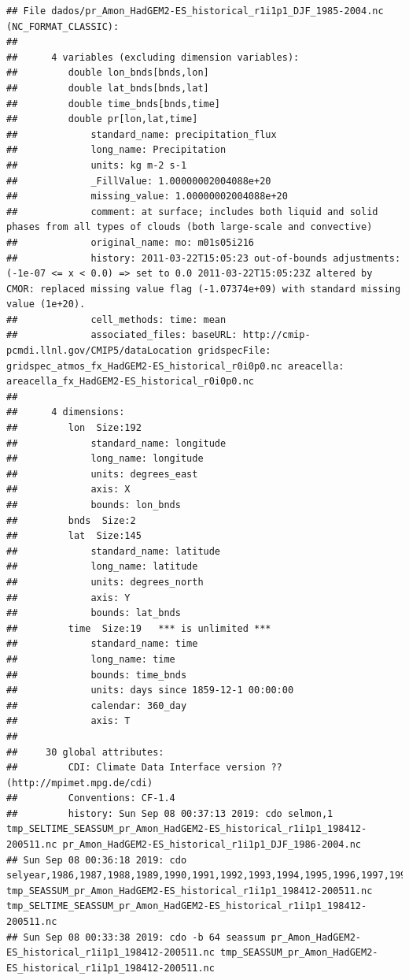 \documentclass[]{book}
\begin{document}
\begin{verbatim}
## File dados/pr_Amon_HadGEM2-ES_historical_r1i1p1_DJF_1985-2004.nc (NC_FORMAT_CLASSIC):
## 
##      4 variables (excluding dimension variables):
##         double lon_bnds[bnds,lon]   
##         double lat_bnds[bnds,lat]   
##         double time_bnds[bnds,time]   
##         double pr[lon,lat,time]   
##             standard_name: precipitation_flux
##             long_name: Precipitation
##             units: kg m-2 s-1
##             _FillValue: 1.00000002004088e+20
##             missing_value: 1.00000002004088e+20
##             comment: at surface; includes both liquid and solid phases from all types of clouds (both large-scale and convective)
##             original_name: mo: m01s05i216
##             history: 2011-03-22T15:05:23 out-of-bounds adjustments: (-1e-07 <= x < 0.0) => set to 0.0 2011-03-22T15:05:23Z altered by CMOR: replaced missing value flag (-1.07374e+09) with standard missing value (1e+20).
##             cell_methods: time: mean
##             associated_files: baseURL: http://cmip-pcmdi.llnl.gov/CMIP5/dataLocation gridspecFile: gridspec_atmos_fx_HadGEM2-ES_historical_r0i0p0.nc areacella: areacella_fx_HadGEM2-ES_historical_r0i0p0.nc
## 
##      4 dimensions:
##         lon  Size:192
##             standard_name: longitude
##             long_name: longitude
##             units: degrees_east
##             axis: X
##             bounds: lon_bnds
##         bnds  Size:2
##         lat  Size:145
##             standard_name: latitude
##             long_name: latitude
##             units: degrees_north
##             axis: Y
##             bounds: lat_bnds
##         time  Size:19   *** is unlimited ***
##             standard_name: time
##             long_name: time
##             bounds: time_bnds
##             units: days since 1859-12-1 00:00:00
##             calendar: 360_day
##             axis: T
## 
##     30 global attributes:
##         CDI: Climate Data Interface version ?? (http://mpimet.mpg.de/cdi)
##         Conventions: CF-1.4
##         history: Sun Sep 08 00:37:13 2019: cdo selmon,1 tmp_SELTIME_SEASSUM_pr_Amon_HadGEM2-ES_historical_r1i1p1_198412-200511.nc pr_Amon_HadGEM2-ES_historical_r1i1p1_DJF_1986-2004.nc
## Sun Sep 08 00:36:18 2019: cdo selyear,1986,1987,1988,1989,1990,1991,1992,1993,1994,1995,1996,1997,1998,1999,2000,2001,2002,2003,2004 tmp_SEASSUM_pr_Amon_HadGEM2-ES_historical_r1i1p1_198412-200511.nc tmp_SELTIME_SEASSUM_pr_Amon_HadGEM2-ES_historical_r1i1p1_198412-200511.nc
## Sun Sep 08 00:33:38 2019: cdo -b 64 seassum pr_Amon_HadGEM2-ES_historical_r1i1p1_198412-200511.nc tmp_SEASSUM_pr_Amon_HadGEM2-ES_historical_r1i1p1_198412-200511.nc

\end{verbatim}
\end{document}
